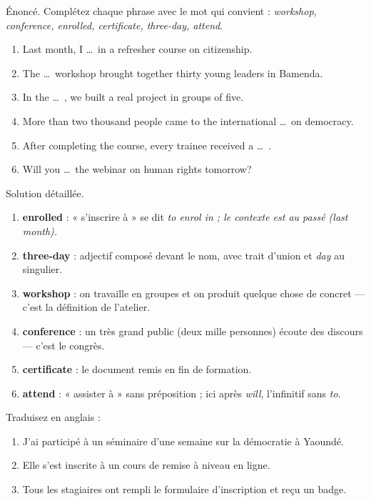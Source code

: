 \documentclass[11pt]{article}
\newcommand{\eng}[1]{\ifmmode\text{\textit{#1}}\else\begingroup\selectlanguage{english}\itshape #1\endgroup\fi}
\begin{document}
\begin{exoresolu}
Énoncé. Complétez chaque phrase avec le mot qui convient : \emph{workshop, conference, enrolled, certificate, three-day, attend}.
\begin{enumerate}
\item Last month, I \dots\ in a refresher course on citizenship.
\item The \dots\ workshop brought together thirty young leaders in Bamenda.
\item In the \dots\ , we built a real project in groups of five.
\item More than two thousand people came to the international \dots\ on democracy.
\item After completing the course, every trainee received a \dots\ .
\item Will you \dots\ the webinar on human rights tomorrow?
\end{enumerate}
\tcblower
Solution détaillée.
\begin{enumerate}
\item \textbf{enrolled} : « s'inscrire à » se dit \eng{to enrol in} ; le contexte est au passé (\emph{last month}).
\item \textbf{three-day} : adjectif composé devant le nom, avec trait d'union et \emph{day} au singulier.
\item \textbf{workshop} : on travaille en groupes et on produit quelque chose de concret — c'est la définition de l'atelier.
\item \textbf{conference} : un très grand public (deux mille personnes) écoute des discours — c'est le congrès.
\item \textbf{certificate} : le document remis en fin de formation.
\item \textbf{attend} : « assister à » sans préposition ; ici après \emph{will}, l'infinitif sans \emph{to}.
\end{enumerate}
\end{exoresolu}

\begin{exercice}
Traduisez en anglais :
\begin{enumerate}
\item J'ai participé à un séminaire d'une semaine sur la démocratie à Yaoundé.
\item Elle s'est inscrite à un cours de remise à niveau en ligne.
\item Tous les stagiaires ont rempli le formulaire d'inscription et reçu un badge.
\end{enumerate}
\end{exercice}
\end{document}
